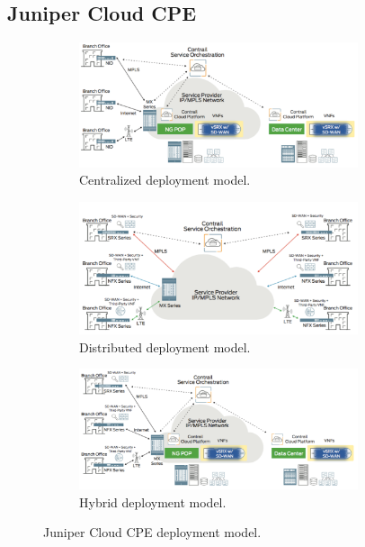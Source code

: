 \subsection{Juniper Cloud CPE}
\begin{figure}[!htp]
  \centering
  \begin{subfigure}[b]{\textwidth}
    \centering
    \includegraphics[width=0.9\textwidth]{./fig/juniper_central.png}
    \caption{Centralized deployment model.}
    \label{fig:juniper_central}
  \end{subfigure}
  \hfill
  \begin{subfigure}[b]{\textwidth}
    \centering
    \includegraphics[width=0.9\textwidth]{./fig/juniper_distributed.png}
    \caption{Distributed deployment model.}
    \label{fig:juniper_distributed}
  \end{subfigure}
  \hfill
  \begin{subfigure}[b]{\textwidth}
    \centering
    \includegraphics[width=0.9\textwidth]{./fig/juniper_hybrid.png}
    \caption{Hybrid deployment model.}
    \label{fig:juniper_hybrid}
  \end{subfigure}
  \caption{Juniper Cloud CPE deployment model. \cite{juniper-cpe}}
  \label{fig:juniper-cpe}
\end{figure}

